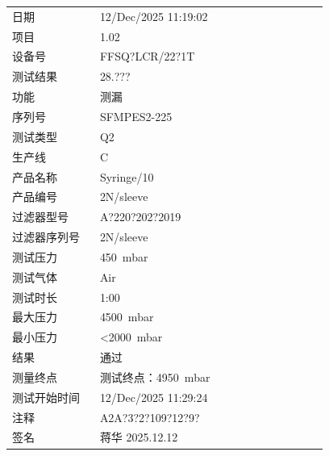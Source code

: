 \documentclass[UTF8,10pt,a4paper,fontset=fandol]{ctexart}
\newcommand{\fieldvalue}[1]{#1}
\newcommand{\handwritten}[1]{#1}
\begin{document}
\begin{tabular}{@{}p{0.25\linewidth}p{0.65\linewidth}@{}}
日期 &
\fieldvalue{12/Dec/2025 11:19:02}
\\[2pt]
项目 &
\fieldvalue{1.02}
\\[2pt]
设备号 &
\fieldvalue{FFSQ?LCR/22?1T}
\\[2pt]
测试结果 &
\fieldvalue{28.???}
\\[2pt]
功能 &
\fieldvalue{测漏}
\\[2pt]
序列号 &
\fieldvalue{SFMPES2-225}
\\[2pt]
测试类型 &
\fieldvalue{Q2}
\\[2pt]
生产线 &
\fieldvalue{C}
\\[2pt]
产品名称 &
\fieldvalue{Syringe/10}
\\[2pt]
产品编号 &
\fieldvalue{2N/sleeve}
\\[2pt]
过滤器型号 &
\fieldvalue{A?220?202?2019}
\\[2pt]
过滤器序列号 &
\fieldvalue{2N/sleeve}
\\[2pt]
测试压力 &
\fieldvalue{450\ mbar}
\\[2pt]
测试气体 &
\fieldvalue{Air}
\\[2pt]
测试时长 &
\fieldvalue{1:00}
\\[2pt]
最大压力 &
\fieldvalue{4500\ mbar}
\\[2pt]
最小压力 &
\fieldvalue{<2000\ mbar}
\\[2pt]
结果 &
\fieldvalue{通过}
\\[2pt]
测量终点 &
\fieldvalue{测试终点：4950\ mbar}
\\[2pt]
测试开始时间 &
\fieldvalue{12/Dec/2025 11:29:24}
\\[2pt]
注释 &
\fieldvalue{A2A?3?2?109?12?9?}
\\[2pt]
签名 &
\fieldvalue{\handwritten{蒋华 2025.12.12}}
\end{tabular}
\end{document}
